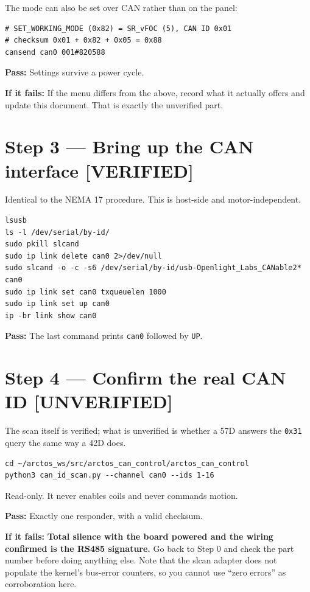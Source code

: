 \documentclass[11pt,letterpaper]{article}
\newcommand{\verified}{{\color{okgreen}\textbf{[VERIFIED]}}}
\newcommand{\unverified}{{\color{unverifiedorange}\textbf{[UNVERIFIED]}}}
\newcommand{\passif}[1]{\par\vspace{2pt}\noindent\textbf{\color{okgreen}Pass:} #1\par\vspace{4pt}}
\newcommand{\failif}[1]{\noindent\textbf{If it fails:} #1\par\vspace{6pt}}
\begin{document}
The mode can also be set over CAN rather than on the panel:

\begin{lstlisting}
# SET_WORKING_MODE (0x82) = SR_vFOC (5), CAN ID 0x01
# checksum 0x01 + 0x82 + 0x05 = 0x88
cansend can0 001#820588
\end{lstlisting}

\passif{Settings survive a power cycle.}
\failif{If the menu differs from the above, record what it actually offers and update
this document. That is exactly the unverified part.}

\section*{Step 3 --- Bring up the CAN interface \verified}

Identical to the NEMA 17 procedure. This is host-side and motor-independent.

\begin{lstlisting}
lsusb
ls -l /dev/serial/by-id/
sudo pkill slcand
sudo ip link delete can0 2>/dev/null
sudo slcand -o -c -s6 /dev/serial/by-id/usb-Openlight_Labs_CANable2* can0
sudo ip link set can0 txqueuelen 1000
sudo ip link set up can0
ip -br link show can0
\end{lstlisting}

\passif{The last command prints \texttt{can0} followed by \texttt{UP}.}

\section*{Step 4 --- Confirm the real CAN ID \unverified}

The scan itself is verified; what is unverified is whether a 57D answers the
\texttt{0x31} query the same way a 42D does.

\begin{lstlisting}
cd ~/arctos_ws/src/arctos_can_control/arctos_can_control
python3 can_id_scan.py --channel can0 --ids 1-16
\end{lstlisting}

Read-only. It never enables coils and never commands motion.

\passif{Exactly one responder, with a valid checksum.}
\failif{\textbf{Total silence with the board powered and the wiring confirmed is the
RS485 signature.} Go back to Step 0 and check the part number before doing anything
else. Note that the slcan adapter does not populate the kernel's bus-error counters,
so you cannot use ``zero errors'' as corroboration here.}
\end{document}

